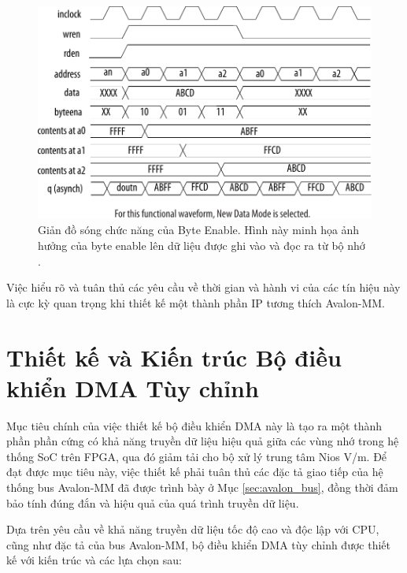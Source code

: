 \begin{figure}[htbp]
    \centering
    \includegraphics[width=0.8\linewidth]{Images/02_02_Memory_ByteEnable.pdf}
    \caption{Giản đồ sóng chức năng của Byte Enable. Hình này minh họa ảnh hưởng của byte enable lên dữ liệu được ghi vào và đọc ra từ bộ nhớ \cite{memory_byteenable}.}
    \label{fig:02_02_memory_byteenable} %
\end{figure}



Việc hiểu rõ và tuân thủ các yêu cầu về thời gian và hành vi của các tín hiệu này là cực kỳ quan trọng khi thiết kế một thành phần IP tương thích Avalon-MM.

\section{Thiết kế và Kiến trúc Bộ điều khiển DMA Tùy chỉnh}
\label{sec:dma_design_and_architecture} %
Mục tiêu chính của việc thiết kế bộ điều khiển DMA này là tạo ra một thành phần phần cứng có khả năng truyền dữ liệu hiệu quả giữa các vùng nhớ trong hệ thống SoC trên FPGA, qua đó giảm tải cho bộ xử lý trung tâm Nios V/m. Để đạt được mục tiêu này, việc thiết kế phải tuân thủ các đặc tả giao tiếp của hệ thống bus Avalon-MM đã được trình bày ở Mục \ref{sec:avalon_bus}, đồng thời đảm bảo tính đúng đắn và hiệu quả của quá trình truyền dữ liệu.

Dựa trên yêu cầu về khả năng truyền dữ liệu tốc độ cao và độc lập với CPU, cũng như đặc tả của bus Avalon-MM, bộ điều khiển DMA tùy chỉnh được thiết kế với kiến trúc và các lựa chọn sau:

